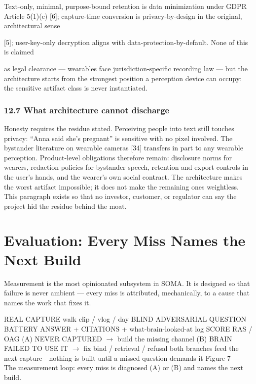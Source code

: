 Text-only, minimal, purpose-bound retention is data minimization under GDPR Article 5(1)(c) {[}6{]}; capture-time conversion is privacy-by-design in the original, architectural sense

{[}5{]}; user-key-only decryption aligns with data-protection-by-default. None of this is claimed

as legal clearance --- wearables face jurisdiction-specific recording law --- but the architecture starts from the strongest position a perception device can occupy: the sensitive artifact class is never instantiated.

\subsection{12.7 What architecture cannot discharge}\label{what-architecture-cannot-discharge}

Honesty requires the residue stated. Perceiving people into text still touches privacy: ``Anna said she's pregnant'' is sensitive with no pixel involved. The bystander literature on wearable cameras {[}34{]} transfers in part to any wearable perception. Product-level obligations therefore remain: disclosure norms for wearers, redaction policies for bystander speech, retention and export controls in the user's hands, and the wearer's own social contract. The architecture makes the worst artifact impossible; it does not make the remaining ones weightless. This paragraph exists so that no investor, customer, or regulator can say the project hid the residue behind the moat.

\chapter{Evaluation: Every Miss Names the Next Build}\label{evaluation-every-miss-names-the-next-build}

Measurement is the most opinionated subsystem in SOMA. It is designed so that failure is never ambient --- every miss is attributed, mechanically, to a cause that names the work that fixes it.

REAL CAPTURE walk clip / vlog / day BLIND ADVERSARIAL QUESTION BATTERY ANSWER + CITATIONS + what-brain-looked-at log SCORE RAS / OAG (A) NEVER CAPTURED \(\rightarrow\) build the missing channel (B) BRAIN FAILED TO USE IT \(\rightarrow\) fix bind / retrieval / refusal both branches feed the next capture - nothing is built until a missed question demands it Figure 7 --- The measurement loop: every miss is diagnosed (A) or (B) and names the next build.

